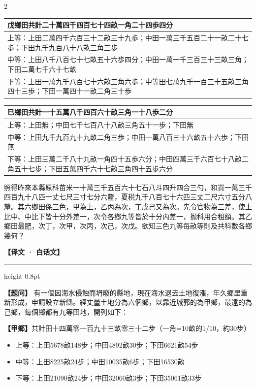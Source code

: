 \documentclass[11pt,a4paper]{article}
\newcommand{\ModernQuestion}[1]{\par\noindent\textbf{\color{modernlabel}【题问】}#1\par}
\newcommand{\ModernHeader}{%
  \begin{center}\textbf{\color{headermodern}【译文 · 白话文】}\end{center}
  \vspace{-0.5em}
  \hrule height 0.8pt
  \vspace{0.5em}
}
\begin{document}
\begin{paracol}{2}
{\begin{longtable}{p{}}
\toprule
\textbf{戊鄉}田共計二十萬四千四百七十四畝一角二十四歩四分\\
\midrule
\endhead
上等：上田二萬四千六百三十二畝三十九歩；中田一萬三千五百二十一畝二十七歩；下田九千九百八十八畝三角三歩\\
中等：上田八千八百七十七畝五十六歩四分；中田一萬一千三百三十三畝三角；下田二萬七千六十七畝\\
下等：上田一萬九千八百七十六畝三角六歩；中等田七萬九千一百三十五畝三角四十三歩；下田一萬四十一畝二角三十歩\\
\bottomrule
\end{longtable}

\begin{longtable}{p{}}
\toprule
\textbf{已鄉}田共計一十五萬八千四百六十畝三角一十八歩二分\\
\midrule
\endhead
上等：上田無；中田七千七百八十八畝三角五十一歩；下田無\\
中等：上田九千九百九十九畝二角三歩；中田一萬八百三十六畝五十六歩；下田無\\
下等：上田三萬二千八十九畝一角四十五歩六分；中田四萬三千六百七十八畝二角五十七歩；下田五萬四千六十七畝三角四十五歩六分\\
\bottomrule
\end{longtable}

照得昨來本縣原科苗米一十萬三千五百六十七石八斗四升四合三勺，和買一萬三千四百九十八匹一丈七尺三寸七分六釐，夏税九千八百七十六匹三丈二尺六寸五分八釐。其六鄉田係三色，甲為上，乙丙為次，丁戊己又為次。先令官物為三差，使上比中、中比下皆十分外差一，次令各鄉九等皆於十分内差一，抛科用合租額。其乙鄉田最肥，次丁，次甲，次丙，次己，次戊。欲知三色九等毎畝等則及共科數各鄉幾何？
}

\switchcolumn

\ModernHeader

\ModernQuestion{%
有一個因海水侵蝕而坍廢的縣地，現在海水退去土地復漲，年久鄉里重新形成，申請設立新縣。經丈量土地分為六個鄉，以靠近城郭的為甲鄉，最遠的為己鄉，每個鄉都有九等田地，開列如下：

\textbf{【甲鄉】}共計田十四萬零一百九十三畝零三十二步（一角=10畝的1/10，約30步）

\begin{itemize}[leftmargin=1.5em,topsep=0pt,itemsep=1pt]
\item 上等：上田5678畝148步；中田4892畝30步；下田6621畝54步
\item 中等：上田8225畝24步；中田10035畝6步；下田16530畝
\item 下等：上田21090畝24步；中田32060畝3步；下田35061畝33步
\end{itemize}

}
\end{paracol}
\end{document}
